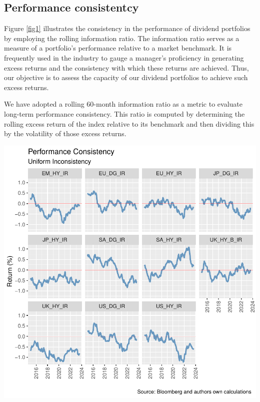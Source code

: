 \documentclass[11pt,preprint, authoryear]{elsarticle}
\let\origfigure\figure
\let\endorigfigure\endfigure
\renewenvironment{figure}[1][2] {
    \expandafter\origfigure\expandafter[H]
} {
    \endorigfigure
}
\numberwithin{equation}{section}
\numberwithin{figure}{section}
\numberwithin{table}{section}
\begin{document}
\hypertarget{performance-consistentcy}{%
\subsection{Performance consistentcy}\label{performance-consistentcy}}

Figure \ref{fig1} illustrates the consistency in the performance of
dividend portfolios by employing the rolling information ratio. The
information ratio serves as a measure of a portfolio's performance
relative to a market benchmark. It is frequently used in the industry to
gauge a manager's proficiency in generating excess returns and the
consistency with which these returns are achieved. Thus, our objective
is to assess the capacity of our dividend portfolios to achieve such
excess returns.

We have adopted a rolling 60-month information ratio as a metric to
evaluate long-term performance consistency. This ratio is computed by
determining the rolling excess return of the index relative to its
benchmark and then dividing this by the volatility of those excess
returns.

\begin{figure}[H]

\includegraphics{ThesisWriteUp_files/figure-latex/unnamed-chunk-1-1} \hfill{}

\caption{Rolling 3 Year Returns \label{fig1}}\label{fig:unnamed-chunk-1}
\end{figure}
\end{document}
